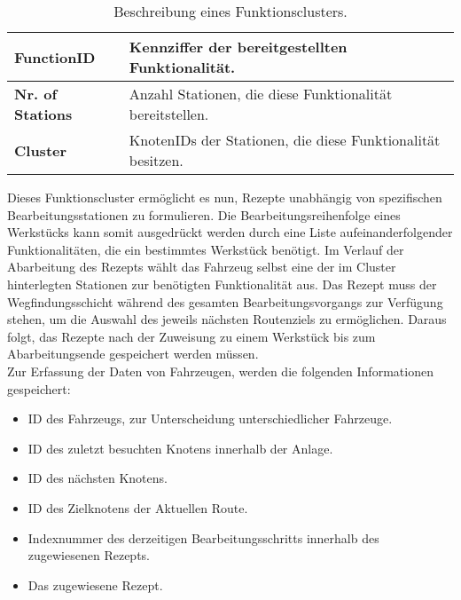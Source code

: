 			\begin{table}[h]
				\begin{longtable}{| l | l |}
					
					\hline
					\textbf{FunctionID} & Kennziffer der bereitgestellten Funktionalität.\\ \hline
					\textbf{Nr. of Stations} & Anzahl Stationen, die diese Funktionalität bereitstellen.\\ \hline
					\textbf{Cluster} & KnotenIDs der Stationen, die diese Funktionalität besitzen.\\
					\hline
					
				\end{longtable}
				\vspace{0.2cm}
				\caption{Beschreibung eines Funktionsclusters.}
			\end{table}
			
			Dieses Funktionscluster ermöglicht es nun, Rezepte unabhängig von spezifischen Bearbeitungsstationen zu formulieren. Die Bearbeitungsreihenfolge eines Werkstücks kann somit ausgedrückt werden durch eine Liste aufeinanderfolgender Funktionalitäten, die ein bestimmtes Werkstück benötigt. Im Verlauf der Abarbeitung des Rezepts wählt das Fahrzeug selbst eine der im Cluster hinterlegten Stationen zur benötigten Funktionalität aus. Das Rezept muss der Wegfindungsschicht während des gesamten Bearbeitungsvorgangs zur Verfügung stehen, um die Auswahl des jeweils nächsten Routenziels zu ermöglichen. Daraus folgt, das Rezepte nach der Zuweisung zu einem Werkstück bis zum Abarbeitungsende gespeichert werden müssen.
			\\[4pt]
			Zur Erfassung der Daten von Fahrzeugen, werden die folgenden Informationen gespeichert:
			
			\begin{itemize}
				\item ID des Fahrzeugs, zur Unterscheidung unterschiedlicher Fahrzeuge.
				\item ID des zuletzt besuchten Knotens innerhalb der Anlage.
				\item ID des nächsten Knotens. 
				\item ID des Zielknotens der Aktuellen Route.
				\item Indexnummer des derzeitigen Bearbeitungsschritts innerhalb des zugewiesenen Rezepts.
				\item Das zugewiesene Rezept.
			\end{itemize} 
			
